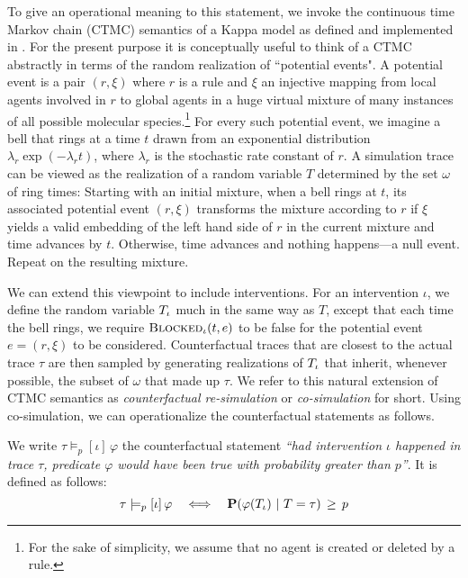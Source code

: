 To give an operational meaning to this statement, we invoke the
continuous time Markov chain (CTMC) semantics of a Kappa model as
defined and implemented in
\cite{DanosEtAl-APLAS07,BoutillierEK17}. For the present purpose it is
conceptually useful to think of a CTMC abstractly in terms of the
random realization of ``potential events". A potential event is a pair
$(r, \xi)$ where $r$ is a rule and $\xi$ an injective mapping from
local agents involved in $r$ to global agents in a huge virtual
mixture of many instances of all possible molecular
species.\footnote{For the sake of simplicity, we assume that no agent
  is created or deleted by a rule.} For every such potential event, we
imagine a bell that rings at a time $t$ drawn from an exponential
distribution $\lambda_r\exp(-\lambda_r t)$, where $\lambda_r$ is the
stochastic rate constant of $r$. A simulation trace can be viewed as
the realization of a random variable $T$ determined by the set
$\omega$ of ring times: Starting with an initial mixture, when a bell
rings at $t$, its associated potential event $(r, \xi)$ transforms the
mixture according to $r$ if $\xi$ yields a valid embedding of the left
hand side of $r$ in the current mixture and time advances by
$t$. Otherwise, time advances and nothing happens---a null
event. Repeat on the resulting mixture.

We can extend this viewpoint to include interventions. For an
intervention $\iota$, we define the random variable ${T_\iota}{}$ much in
the same way as $T$, except that each time the bell rings, we require
${\textsc{Blocked}}_{\iota}(t, e)$ to be false for the potential event
$e=(r, \xi)$ to be considered.  Counterfactual traces that are closest
to the actual trace $\tau$ are then sampled by generating realizations
of ${T_\iota}{}$ that inherit, whenever possible, the subset of $\omega$
that made up $\tau$. 
We refer to this natural extension of CTMC semantics as
\textit{counterfactual re-simulation} or \textit{co-simulation} for
short. Using co-simulation, we can operationalize the counterfactual
statements as follows.

\begin{definition} We write
  $\tau \models_p [\iota] \, \varphi$ the counterfactual statement
  \textit{``had intervention $\iota$ happened in trace $\tau$,
    predicate $\varphi$ would have been true with probability greater
    than $p$''}.  It is defined as follows:
  \[ \tau \models_p [\iota] \, \varphi \quad \Longleftrightarrow \quad
    \mathbf{P}( \varphi({T_\iota}{}) \ |\ T = \tau) \,\geq\, p \]
\end{definition}

